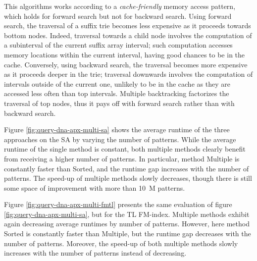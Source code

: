 This algorithms works according to a \emph{cache-friendly} memory access pattern, which holds for forward search but not for backward search.
Using forward search, the traversal of a suffix trie becomes less expensive as it proceeds towards bottom nodes.
Indeed, traversal towards a child node involves the computation of a subinterval of the current suffix array interval; such computation accesses memory locations within the current interval, having good chances to be in the cache.
Conversely, using backward search, the traversal becomes more expensive as it proceeds deeper in the trie; traversal downwards involves the computation of intervals outside of the current one, unlikely to be in the cache as they are accessed less often than top intervals.
Multiple backtracking factorizes the traversal of top nodes, thus it pays off with forward search rather than with backward search.

Figure \ref{fig:query-dna-apx-multi-sa} shows the average runtime of the three approaches on the SA by varying the number of patterns.
While the average runtime of the single method is constant, both multiple methods clearly benefit from receiving a higher number of patterns.
In particular, method Multiple is constantly faster than Sorted, and the runtime gap increases with the number of patterns.
The speed-up of multiple methods slowly decreases, though there is still some space of improvement with more than 10~M patterns.

Figure \ref{fig:query-dna-apx-multi-fmtl} presents the same evaluation of figure \ref{fig:query-dna-apx-multi-sa}, but for the TL FM-index.
Multiple methods exhibit again decreasing average runtimes by number of patterns.
However, here method Sorted is constantly faster than Multiple, but the runtime gap decreases with the number of patterns.
Moreover, the speed-up of both multiple methods slowly increases with the number of patterns instead of decreasing.

